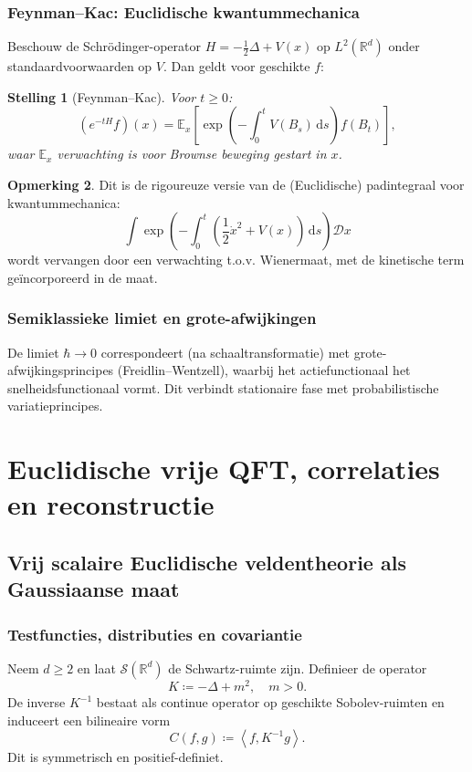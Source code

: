 \documentclass[11pt,a4paper,oneside]{book}
\theoremstyle{plain}
\newtheorem{theorem}{Stelling}[chapter]
\theoremstyle{definition}
\newtheorem{remark}[theorem]{Opmerking}
\newcommand{\R}{\mathbb{R}}
\renewcommand{\dd}{\,\mathrm{d}}
\newcommand{\EE}{\mathbb{E}}
\newcommand{\cD}{\mathcal{D}}
\newcommand{\cS}{\mathcal{S}}
\newcommand{\inner}[2]{\left\langle #1, #2\right\rangle}
\begin{document}
	\section{Feynman--Kac: Euclidische kwantummechanica}
	Beschouw de Schrödinger-operator $H=-\frac12\Delta + V(x)$ op $L^2(\R^d)$ onder standaardvoorwaarden op $V$.
	Dan geldt voor geschikte $f$:
	
	\begin{theorem}[Feynman--Kac]
		Voor $t\ge 0$:
		\[
		(e^{-tH}f)(x)=\EE_x\left[\exp\left(-\int_0^t V(B_s)\dd s\right) f(B_t)\right],
		\]
		waar $\EE_x$ verwachting is voor Brownse beweging gestart in $x$.
	\end{theorem}
	
	\begin{remark}
		Dit is de rigoureuze versie van de (Euclidische) padintegraal voor kwantummechanica:
		\[
		\int \exp\left(-\int_0^t \left(\frac12 \dot x^2 + V(x)\right)\dd s\right)\cD x
		\]
		wordt vervangen door een verwachting t.o.v. Wienermaat, met de kinetische term geïncorporeerd in de maat.
	\end{remark}
	
	\section{Semiklassieke limiet en grote-afwijkingen}
	De limiet $\hbar\to 0$ correspondeert (na schaaltransformatie) met grote-afwijkingsprincipes (Freidlin--Wentzell),
	waarbij het actiefunctionaal het snelheidsfunctionaal vormt. Dit verbindt stationaire fase met probabilistische variatieprincipes.
	
	\part{Euclidische vrije QFT, correlaties en reconstructie}
	
	\chapter{Vrij scalaire Euclidische veldentheorie als Gaussiaanse maat}
	
	\section{Testfuncties, distributies en covariantie}
	Neem $d\ge 2$ en laat $\cS(\R^d)$ de Schwartz-ruimte zijn. Definieer de operator
	\[
	K \coloneqq -\Delta + m^2,\quad m>0.
	\]
	De inverse $K^{-1}$ bestaat als continue operator op geschikte Sobolev-ruimten en induceert een bilineaire vorm
	\[
	C(f,g)\coloneqq \inner{f}{K^{-1}g}.
	\]
	Dit is symmetrisch en positief-definiet.
	
\end{document}
